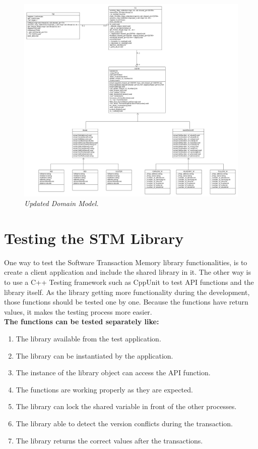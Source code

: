 \documentclass[12pt]{article}
\begin{document}
\begin{figure}[h!]
\centering
\includegraphics[scale=0.25]{Pictures/Domain_model.png}
\caption{\textit{\color{gray}Updated Domain Model.}}
\end{figure}

\section{Testing the STM Library}
One way to test the Software Transaction Memory library functionalities, is to create a client application and include the shared library in it. The other way is to use a C++ Testing framework such as CppUnit to test API functions and the library itself.
As the library getting more functionality during the development, those functions should be tested one by one. Because the functions have return values, it makes the testing process more easier.\\

\textbf{The functions can be tested separately like:}
\begin{enumerate}
\item The library available from the test application.
\item The library can be instantiated by the application.
\item The instance of the library object can access the API function.
\item The functions are working properly as they are expected.
\item The library can lock the shared variable in front of the other processes.
\item The library able to detect the version conflicts during the transaction.
\item The library returns the correct values after the transactions.
\end{enumerate}
\end{document}
